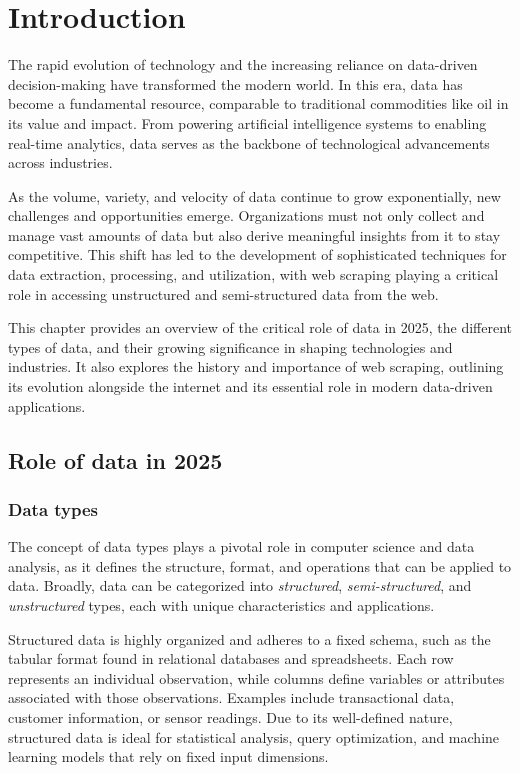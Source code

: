 \chapter{Introduction}
The rapid evolution of technology and the increasing reliance on data-driven decision-making have transformed the modern world. In this era, data has become a fundamental resource, comparable to traditional commodities like oil in its value and impact. From powering artificial intelligence systems to enabling real-time analytics, data serves as the backbone of technological advancements across industries.

As the volume, variety, and velocity of data continue to grow exponentially, new challenges and opportunities emerge. Organizations must not only collect and manage vast amounts of data but also derive meaningful insights from it to stay competitive. This shift has led to the development of sophisticated techniques for data extraction, processing, and utilization, with web scraping playing a critical role in accessing unstructured and semi-structured data from the web.

This chapter provides an overview of the critical role of data in 2025, the different types of data, and their growing significance in shaping technologies and industries. It also explores the history and importance of web scraping, outlining its evolution alongside the internet and its essential role in modern data-driven applications.
\section{Role of data in  2025}
\subsection{Data types}

The concept of data types plays a pivotal role in computer science and data analysis, as it defines the structure, format, and operations that can be applied to data. Broadly, data can be categorized into \textit{structured}, \textit{semi-structured}, and \textit{unstructured} types, each with unique characteristics and applications.

Structured data is highly organized and adheres to a fixed schema, such as the tabular format found in relational databases and spreadsheets. Each row represents an individual observation, while columns define variables or attributes associated with those observations. Examples include transactional data, customer information, or sensor readings. Due to its well-defined nature, structured data is ideal for statistical analysis, query optimization, and machine learning models that rely on fixed input dimensions.

